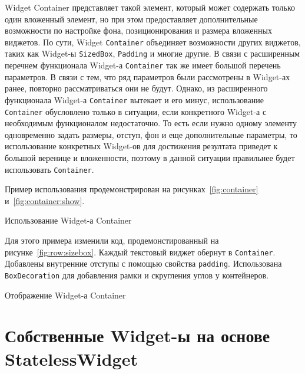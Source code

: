 Widget Container представляет такой элемент,
который может содержать только один вложенный элемент,
но при этом предоставляет дополнительные возможности по настройке фона,
позиционирования и размера вложенных виджетов.
По сути, Widget \texttt{Container} объединяет возможности других виджетов,
таких как Widget-ы \texttt{SizedBox}, \texttt{Padding} и многие другие.
В связи с расширенным перечнем функционала Widget-а \texttt{Container}
так же имеет большой перечень параметров.
В связи с тем, что ряд параметров были рассмотрены в Widget-ах ранее,
повторно рассматриваться они не будут.
Однако, из расширенного функционала Widget-а \texttt{Container} вытекает
и его минус, использование \texttt{Container} обусловлено только в ситуации,
если конкретного Widget-а с необходимым функционалом недостаточно.
То есть если нужно одному элементу одновременно задать размеры, отступ,
фон и еще дополнительные параметры, то использование конкретных Widget-ов
для достижения резултата приведет к большой веренице и вложенности,
поэтому в данной ситуации правильнее будет использовать \texttt{Container}.

Пример использования продемонстрирован
на рисунках~\ref{fig:container} и~\ref{fig:container:show}.

\begin{image}
	\caption{Использование Widget-а Container}
	\label{fig:container}
\end{image}

Для этого примера изменили код, продемонстированный
на рисунке~\ref{fig:row:sizebox}.
Каждый текстовый виджет обернут в \texttt{Container}.
Добавлены внутренние отступы с помощью свойства \texttt{padding}.
Использована \texttt{BoxDecoration} для добавления рамки
и скругления углов у контейнеров.

\begin{image}
	\caption{Отображение Widget-а Container}
	\label{fig:container:show}
\end{image}

\section{Собственные Widget-ы на основе StatelessWidget}

